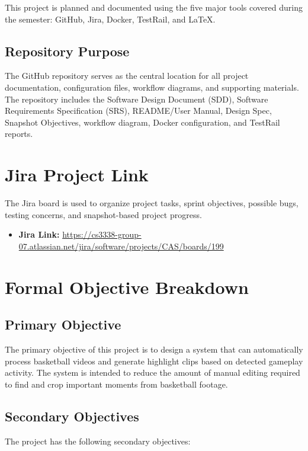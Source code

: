 \documentclass[12pt]{article}
\begin{document}
This project is planned and documented using the five major tools covered during the semester: GitHub, Jira, Docker, TestRail, and LaTeX.

\subsection{Repository Purpose}
The GitHub repository serves as the central location for all project documentation, configuration files, workflow diagrams, and supporting materials. The repository includes the Software Design Document (SDD), Software Requirements Specification (SRS), README/User Manual, Design Spec, Snapshot Objectives, workflow diagram, Docker configuration, and TestRail reports.

\section{Jira Project Link}

The Jira board is used to organize project tasks, sprint objectives, possible bugs, testing concerns, and snapshot-based project progress.

\begin{itemize}[noitemsep]
    \item \textbf{Jira Link:} \url{https://cs3338-group-07.atlassian.net/jira/software/projects/CAS/boards/199}
\end{itemize}

\section{Formal Objective Breakdown}

\subsection{Primary Objective}
The primary objective of this project is to design a system that can automatically process basketball videos and generate highlight clips based on detected gameplay activity. The system is intended to reduce the amount of manual editing required to find and crop important moments from basketball footage.

\subsection{Secondary Objectives}
The project has the following secondary objectives:
\end{document}

